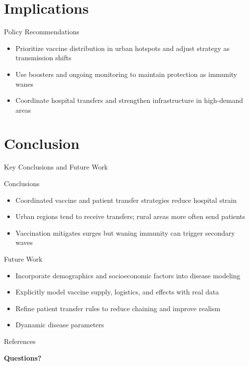 \documentclass[aspectratio=169,xcolor=dvipsnames]{beamer}
\begin{document}
\section{Implications}
\begin{frame}{Policy Recommendations}
    \begin{itemize}
        \item Prioritize vaccine distribution in urban hotspots and adjust strategy as transmission shifts
        \item Use boosters and ongoing monitoring to maintain protection as immunity wanes
        \item Coordinate hospital transfers and strengthen infrastructure in  high-demand areas
    \end{itemize}
    
\end{frame}

\section{Conclusion}
\begin{frame}{Key Conclusions and Future Work}
    \begin{minipage}[t]{0.48\textwidth}
        \begin{block}{Conclusions}
            \begin{itemize}
                \item Coordinated vaccine and patient transfer strategies reduce hospital strain
                \item Urban regions tend to receive transfers; rural areas more often send patients
                \item Vaccination mitigates surges but waning immunity can trigger secondary waves
            \end{itemize}
        \end{block}
    \end{minipage}
    \hfill
    \begin{minipage}[t]{0.48\textwidth}
        \begin{block}{Future Work}
            \begin{itemize}
                \item Incorporate demographics and socioeconomic factors into disease modeling
                \item Explicitly model vaccine supply, logistics, and effects with real data
                \item Refine patient transfer rules to reduce chaining and improve realism
                \item Dyanamic disease parameters
            \end{itemize}
        \end{block}
    \end{minipage}
\end{frame}
    

\begin{frame}[allowframebreaks]{References}
    \tiny
    
    
\end{frame}
 
\begin{frame}
    \Huge{\centerline{\textbf{Questions?}}}
\end{frame}
\end{document}
